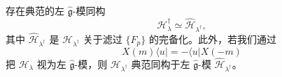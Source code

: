 \begin{corollary}[2.18]
存在典范的左 $\hat{\mathfrak{g}}$-模同构
\[
\mathcal{H}^{\dagger}_{\lambda}\simeq\widehat{\mathcal{H}}_{\lambda^{\dagger}},
\]
其中 $\widehat{\mathcal{H}}_{\lambda^{\dagger}}$ 是 $\mathcal{H}_{\lambda^{\dagger}}$ 关于滤过
$\{F_p\}$ 的完备化。此外，若我们通过
\[
X(m)\langle u|=-\langle u|X(-m)
\]
把 $\mathcal{H}_{\lambda}$ 视为左 $\hat{\mathfrak{g}}$-模，则 $\mathcal{H}_{\lambda^{\dagger}}$
典范同构于左 $\hat{\mathfrak{g}}$-模 $\widehat{\mathcal{H}}_{\lambda^{\dagger}}$。
\end{corollary}

